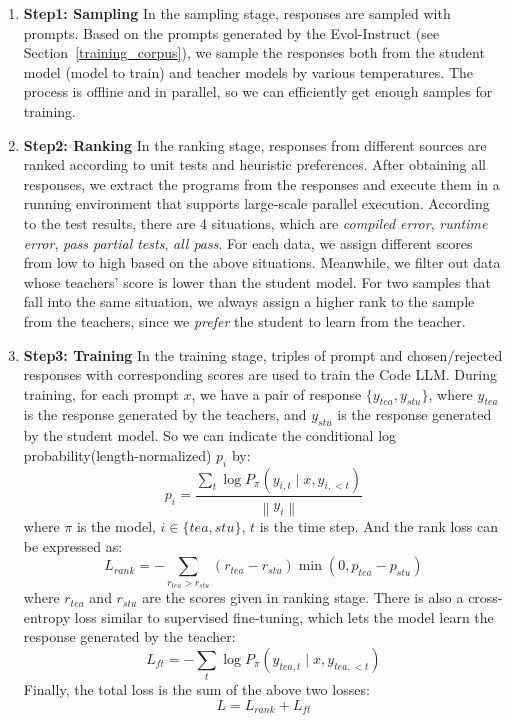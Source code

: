 \documentclass{article}
\begin{document}
\begin{enumerate}
    \item \textbf{Step1: Sampling} In the sampling stage, responses are sampled with prompts. Based on the prompts generated by the Evol-Instruct (see Section~\ref{training_corpus}), we sample the responses both from the student model (model to train) and teacher models by various temperatures. The process is offline and in parallel, so we can efficiently get enough samples for training.
    \item \textbf{Step2: Ranking} In the ranking stage, responses from different sources are ranked according to unit tests and heuristic preferences. After obtaining all responses, we extract the programs from the responses and execute them in a running environment that supports large-scale parallel execution. According to the test results, there are 4 situations, which are \textit{compiled error}, \textit{runtime error}, \textit{pass partial tests}, \textit{all pass}. For each data, we assign different scores from low to high based on the above situations. Meanwhile, we filter out data whose teachers' score is lower than the student model. For two samples that fall into the same situation, we always assign a higher rank to the sample from the teachers, since we \textit{prefer} the student to learn from the teacher.
    \item \textbf{Step3: Training} In the training stage, triples of prompt and chosen/rejected responses with corresponding scores are used to train the Code LLM. During training, for each prompt $x$, we have a pair of response $\{y_{tea}, y_{stu}\}$, where $y_{tea}$ is the response generated by the teachers, and $y_{stu}$ is the response generated by the student model. So we can indicate the conditional log probability(length-normalized) $p_i$ by:
    $$
    p_i=\frac{\sum_t \log P_\pi\left(y_{i, t} \mid x, y_{i,<t}\right)}{\left\|y_i\right\|}
    $$
    where $\pi$ is the model, $i\in\{tea, stu\}$, $t$ is the time step. And the rank loss can be expressed as:
    $$
    L_{rank}={-\sum_{r_{tea}>r_{stu}}(r_{tea}-r_{stu})\min\left(0,p_{tea}-p_{stu}\right)}
    $$
    where $r_{tea}$ and $r_{stu}$ are the scores given in ranking stage. There is also a cross-entropy loss similar to supervised fine-tuning, which lets the model learn the response generated by the teacher:
    $$
    L_{f t}=-\sum_t \log P_\pi\left(y_{tea, t} \mid x, y_{tea,<t}\right)
    $$
    Finally, the total loss is the sum of the above two losses:
    $$
    L=L_{r a n k}+L_{f t}
    $$
\end{enumerate}
\end{document}
